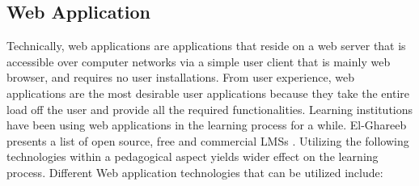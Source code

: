 \documentclass[12pt,a4paper,final,twoside,onecolumn,titlepage]{book}
\begin{document}
\subsection{Web Application}
Technically, web applications are applications that reside on a web server that is accessible over computer networks via a simple user client that is mainly web browser, and requires no user installations. From user experience, web applications are the most desirable user applications because they take the entire load off the user and provide all the required functionalities. Learning institutions have been using web applications in the learning process for a while. El-Ghareeb presents a list of open source, free and commercial \gls{LMS}s \cite{W01}. Utilizing the following technologies within a pedagogical aspect yields wider effect on the learning process. Different Web application technologies that can be utilized include:
\end{document}
